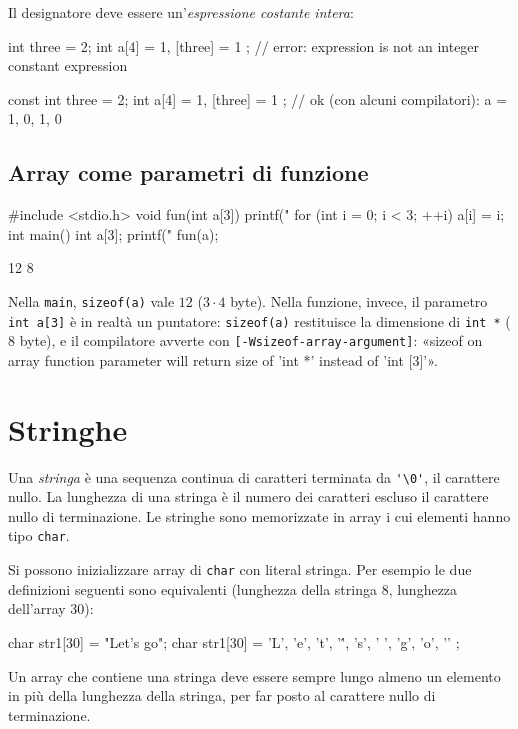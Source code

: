 \documentclass[11pt,a4paper]{article}
\begin{document}
Il designatore deve essere un'\emph{espressione costante intera}:
\begin{codice}
int three = 2;
int a[4] = { 1, [three] = 1 };
// error: expression is not an integer constant expression
\end{codice}
\begin{codice}
const int three = 2;
int a[4] = { 1, [three] = 1 };
// ok (con alcuni compilatori): a = { 1, 0, 1, 0 }
\end{codice}

\subsection{Array come parametri di funzione}

\begin{esempio}
\begin{codice}
#include <stdio.h>
void fun(int a[3]) {
    printf("%
    for (int i = 0; i < 3; ++i)
        a[i] = i;
}
int main() {
    int a[3];
    printf("%
    fun(a);
}
\end{codice}
\begin{risultato}
12
8
\end{risultato}
Nella \lstinline|main|, \lstinline|sizeof(a)| vale $12$ ($3 \cdot 4$ byte). Nella funzione, invece, il parametro \lstinline|int a[3]| è in realtà un puntatore: \lstinline|sizeof(a)| restituisce la dimensione di \lstinline|int *| ($8$ byte), e il compilatore avverte con \texttt{[-Wsizeof-array-argument]}: «sizeof on array function parameter will return size of 'int *' instead of 'int [3]'».
\end{esempio}

\section{Stringhe}

Una \emph{stringa} è una sequenza continua di caratteri terminata da \lstinline|'\0'|, il carattere nullo. La lunghezza di una stringa è il numero dei caratteri escluso il carattere nullo di terminazione. Le stringhe sono memorizzate in array i cui elementi hanno tipo \lstinline|char|.

Si possono inizializzare array di \lstinline|char| con literal stringa. Per esempio le due definizioni seguenti sono equivalenti (lunghezza della stringa $8$, lunghezza dell'array $30$):
\begin{codice}
char str1[30] = "Let's go";
char str1[30] = { 'L', 'e', 't', '\'', 's', ' ', 'g', 'o', '\0' };
\end{codice}
Un array che contiene una stringa deve essere sempre lungo almeno un elemento in più della lunghezza della stringa, per far posto al carattere nullo di terminazione.
\end{document}
